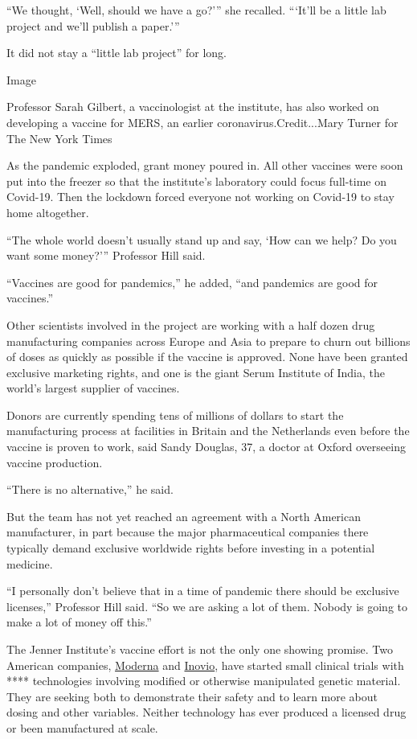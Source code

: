 ``We thought, `Well, should we have a go?''' she recalled. ```It'll be a
little lab project and we'll publish a paper.'''

It did not stay a ``little lab project'' for long.

Image

Professor Sarah Gilbert, a vaccinologist at the institute, has also
worked on developing a vaccine for MERS, an earlier
coronavirus.Credit...Mary Turner for The New York Times

As the pandemic exploded, grant money poured in. All other vaccines were
soon put into the freezer so that the institute's laboratory could focus
full-time on Covid-19. Then the lockdown forced everyone not working on
Covid-19 to stay home altogether.

``The whole world doesn't usually stand up and say, `How can we help? Do
you want some money?''' Professor Hill said.

``Vaccines are good for pandemics,'' he added, ``and pandemics are good
for vaccines.''

Other scientists involved in the project are working with a half dozen
drug manufacturing companies across Europe and Asia to prepare to churn
out billions of doses as quickly as possible if the vaccine is approved.
None have been granted exclusive marketing rights, and one is the giant
Serum Institute of India, the world's largest supplier of vaccines.

Donors are currently spending tens of millions of dollars to start the
manufacturing process at facilities in Britain and the Netherlands even
before the vaccine is proven to work, said Sandy Douglas, 37, a doctor
at Oxford overseeing vaccine production.

``There is no alternative,'' he said.

But the team has not yet reached an agreement with a North American
manufacturer, in part because the major pharmaceutical companies there
typically demand exclusive worldwide rights before investing in a
potential medicine.

``I personally don't believe that in a time of pandemic there should be
exclusive licenses,'' Professor Hill said. ``So we are asking a lot of
them. Nobody is going to make a lot of money off this.''

The Jenner Institute's vaccine effort is not the only one showing
promise. Two American companies,
\href{https://www.nytimes3xbfgragh.onion/2020/03/16/health/coronavirus-vaccine.html}{Moderna}
and
\href{https://www.nytimes3xbfgragh.onion/2020/01/28/health/coronavirus-vaccine.html}{Inovio},
have started small clinical trials with **** technologies involving
modified or otherwise manipulated genetic material. They are seeking
both to demonstrate their safety and to learn more about dosing and
other variables. Neither technology has ever produced a licensed drug or
been manufactured at scale.


